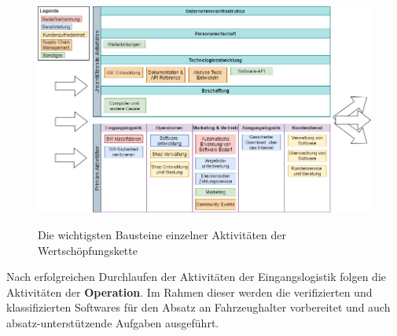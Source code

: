 \begin{figure}[!h]
	\hspace{-2.5cm}
	\includegraphics[width=1.2\columnwidth]{pictures/wsk.png}
	\label{img:wsk}
	\caption{Die wichtigsten Bausteine einzelner Aktivitäten der Wertschöpfungskette}
\end{figure}
Nach erfolgreichen Durchlaufen der Aktivitäten der Eingangslogistik folgen die Aktivitäten der \textbf{Operation}. Im Rahmen dieser werden die verifizierten und klassifizierten Softwares für den Absatz an Fahrzeughalter vorbereitet und auch absatz-unterstützende Aufgaben ausgeführt.

